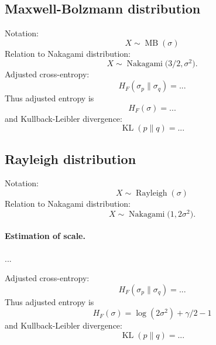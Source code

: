 \documentclass[a4paper,11pt]{article}
\theoremstyle{plain}
\theoremstyle{definition}
\begin{document}
	\subsection{Maxwell-Bolzmann distribution}
	Notation:
	\[
	X \sim \operatorname{MB}(\sigma)
	\]
	Relation to Nakagami distribution:
	\[
	X \sim \operatorname{Nakagami}\big(3/2, \sigma^2 \big).
	\]
	Adjusted cross-entropy:
	\[
	H_F(\sigma_p \| \sigma_q) =  ... 
	\]
	Thus adjusted entropy is
	\[
	H_F(\sigma) = ...
	\]
	and Kullback-Leibler divergence:
	\[
	\operatorname{KL}(p \| q) = ...
	\]
	
	\subsection{Rayleigh distribution}
	Notation:
	\[
	X \sim \operatorname{Rayleigh}(\sigma)
	\]
	Relation to Nakagami distribution:
	\[
	X \sim \operatorname{Nakagami}\big(1, 2\sigma^2\big).
	\]
	\paragraph{Estimation of scale.}
	...%
	
	Adjusted cross-entropy:
	\[
	H_F(\sigma_p \| \sigma_q) =  ... 
	\]
	Thus adjusted entropy is
	\[
	H_F(\sigma) = \log(2\sigma^2) + \gamma / 2 - 1
	\]
	and Kullback-Leibler divergence:
	\[
	\operatorname{KL}(p \| q) = ...
	\]
	
	\pagebreak
	
\end{document}
